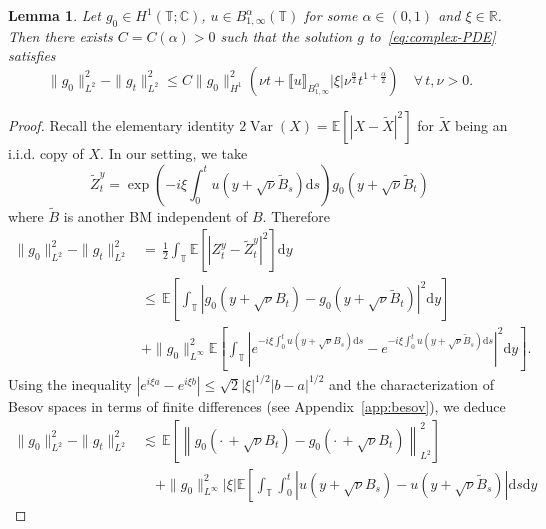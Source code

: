 \documentclass[11pt,oneside,reqno]{amsart}
\newcommand{\mathd}{\mathrm{d}}
\newcommand{\tmop}[1]{\ensuremath{\operatorname{#1}}}
\newtheorem{lemma}[theorem]{Lemma}
\numberwithin{equation}{section}
\begin{document}
\begin{lemma}
  \label{lem:lower-bound-enhanced-1}Let $g_0 \in H^1 (\mathbb{T};
  \mathbb{C})$, $u \in B^{\alpha}_{1, \infty} (\mathbb{T})$ for some $\alpha
  \in (0, 1)$ and $\xi \in \mathbb{R}$. Then there exists $C = C (\alpha) > 0$
  such that the solution $g$ to~\eqref{eq:complex-PDE} satisfies
  \[ \| g_0 \|_{L^2}^2 - \| g_t \|_{L^2}^2 \leqslant C \| g_0 \|^2_{H^1}
     \left( \nu t + \llbracket u \rrbracket_{B^{\alpha}_{1, \infty}} | \xi |
     \nu^{\frac{\alpha}{2}} t^{1 + \frac{\alpha}{2}} \right) \quad \forall \,
     t, \nu > 0. \]
\end{lemma}

\begin{proof}
  Recall the elementary identity $2 \tmop{Var} (X) =\mathbb{E} [| X -
  \tilde{X} |^2]$ for $\tilde{X}$ being an i.i.d. copy of $X$. In our setting,
  we take
  \[ \tilde{Z}^y_t = \exp \left( - i \xi \int_0^t u \left( y + \sqrt{\nu}
     \tilde{B}_s \right) \mathd s \right) g_0 \left( y + \sqrt{\nu}
     \tilde{B}_t \right) \]
  where $\tilde{B}$ is another BM independent of $B$. Therefore
%  
  \begin{align*}
    \| g_0 \|_{L^2}^2 - \| g_t \|_{L^2}^2 & = \, \frac{1}{2} 
    \int_{\mathbb{T}} \mathbb{E} [| Z^y_t - \tilde{Z}^y_t |^2] \mathd y\\
    & \leqslant \, \mathbb{E} \left[ \int_{\mathbb{T}} \left| g_0 \left( y +
    \sqrt{\nu} B_t \right) - g_0 \left( y + \sqrt{\nu} \tilde{B}_t \right)
    \right|^2 \mathd y \right]\\
    & + \| g_0 \|^2_{L^{\infty}} \mathbb{E} \left[ \int_{\mathbb{T}} \left|
    e^{- i \xi \int_0^t u \left( y + \sqrt{\nu} B_s \right) \mathd s} - e^{- i
    \xi \int_0^t u \left( y + \sqrt{\nu} \tilde{B}_s \right) \mathd s}
    \right|^2 \mathd y \right] .
  \end{align*}
%  
  Using the inequality $| e^{i \xi a} - e^{i \xi b} | \leqslant \sqrt{2}  |
  \xi |^{1 / 2} | b - a |^{1 / 2}$ and the characterization of Besov spaces in
  terms of finite differences (see Appendix~\ref{app:besov}), we deduce
%  
  \begin{align*}
    \| g_0 \|_{L^2}^2 - \| g_t \|_{L^2}^2 & \lesssim \, \mathbb{E} \left[
    \left\| g_0 \left( \cdot \, + \sqrt{\nu} B_t \right) - g_0 \left( \cdot \,
    + \sqrt{\nu} B_t \right) \right\|_{L^2}^2 \right] \\
    & \quad + \| g_0 \|_{L^{\infty}}^2  | \xi | \mathbb{E} \left[
    \int_{\mathbb{T}} \int_0^t \left| u \left( y + \sqrt{\nu} B_s \right) - u
    \left( y + \sqrt{\nu} \tilde{B}_s \right) \right| \mathd s \mathd y

\end{align*}
\end{proof}
\end{document}
